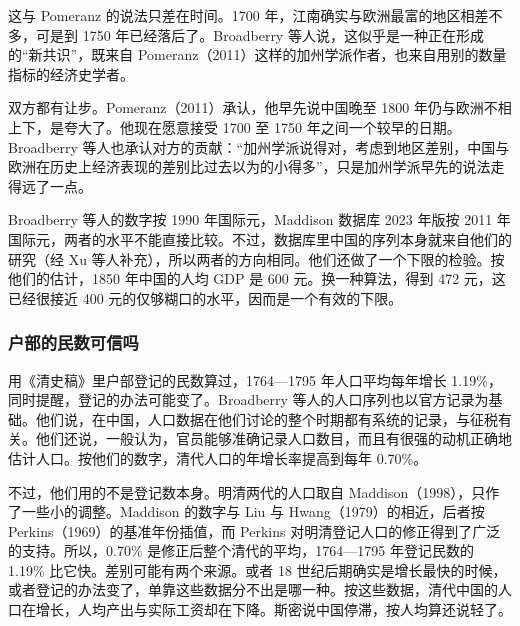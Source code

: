 这与 Pomeranz 的说法只差在时间。1700 年，江南确实与欧洲最富的地区相差不多，可是到 1750 年已经落后了。Broadberry 等人说，这似乎是一种正在形成的“新共识”，既来自 Pomeranz（2011）这样的加州学派作者，也来自用别的数量指标的经济史学者\cite{bgl2017}。

双方都有让步。Pomeranz（2011）承认，他早先说中国晚至 1800 年仍与欧洲不相上下，是夸大了。他现在愿意接受 1700 至 1750 年之间一个较早的日期。Broadberry 等人也承认对方的贡献：“加州学派说得对，考虑到地区差别，中国与欧洲在历史上经济表现的差别比过去以为的小得多”，只是加州学派早先的说法走得远了一点\cite{bgl2017}。

Broadberry 等人的数字按 1990 年国际元，Maddison 数据库 2023 年版按 2011 年国际元，两者的水平不能直接比较。不过，数据库里中国的序列本身就来自他们的研究（经 Xu 等人补充），所以两者的方向相同\cite{mpd2023,bgl2018}。他们还做了一个下限的检验。按他们的估计，1850 年中国的人均 GDP 是 600 元。换一种算法，得到 472 元，这已经很接近 400 元的仅够糊口的水平，因而是一个有效的下限\cite{bgl2017}。

\subsubsection{户部的民数可信吗}
用《清史稿》里户部登记的民数算过，1764—1795 年人口平均每年增长 1.19\%，同时提醒，登记的办法可能变了。Broadberry 等人的人口序列也以官方记录为基础。他们说，在中国，人口数据在他们讨论的整个时期都有系统的记录，与征税有关。他们还说，一般认为，官员能够准确记录人口数目，而且有很强的动机正确地估计人口\cite{bgl2017}。按他们的数字，清代人口的年增长率提高到每年 0.70\%\cite{bgl2017}。

不过，他们用的不是登记数本身。明清两代的人口取自 Maddison（1998），只作了一些小的调整。Maddison 的数字与 Liu 与 Hwang（1979）的相近，后者按 Perkins（1969）的基准年份插值，而 Perkins 对明清登记人口的修正得到了广泛的支持\cite{bgl2017}。所以，0.70\% 是修正后整个清代的平均，1764—1795 年登记民数的 1.19\% 比它快。差别可能有两个来源。或者 18 世纪后期确实是增长最快的时候，或者登记的办法变了，单靠这些数据分不出是哪一种。按这些数据，清代中国的人口在增长，人均产出与实际工资却在下降。斯密说中国停滞，按人均算还说轻了。

